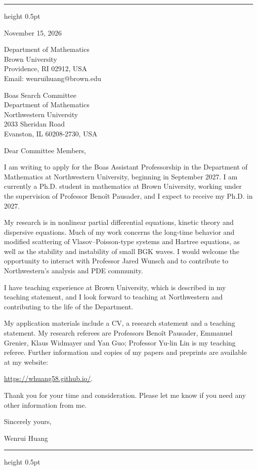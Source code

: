 \documentclass[10pt]{article}
\begin{document}
\vspace{0.08in}
\hrule height 0.5pt

\vspace{0.47in}
\hfill
\begin{minipage}{2.27in}
November 15, 2026

\vspace{0.16in}
Department of Mathematics\\
Brown University\\
Providence, RI 02912, USA\\
Email: wenrui\textunderscore huang@brown.edu
\end{minipage}

\vspace{0.30in}
Boas Search Committee\\
Department of Mathematics\\
Northwestern University\\
2033 Sheridan Road\\
Evanston, IL 60208-2730, USA

\vspace{0.16in}
Dear Committee Members,

I am writing to apply for the Boas Assistant Professorship in the Department of Mathematics at Northwestern University, beginning in September 2027. I am currently a Ph.D. student in mathematics at Brown University, working under the supervision of Professor Beno\^{i}t Pausader, and I expect to receive my Ph.D. in 2027.

My research is in nonlinear partial differential equations, kinetic theory and dispersive equations. Much of my work concerns the long-time behavior and modified scattering of Vlasov--Poisson-type systems and Hartree equations, as well as the stability and instability of small BGK waves. I would welcome the opportunity to interact with Professor Jared Wunsch and to contribute to Northwestern's analysis and PDE community.

I have teaching experience at Brown University, which is described in my teaching statement, and I look forward to teaching at Northwestern and contributing to the life of the Department.

My application materials include a CV, a research statement and a teaching statement. My research referees are Professors Beno\^{i}t Pausader, Emmanuel Grenier, Klaus Widmayer and Yan Guo; Professor Yu-lin Lin is my teaching referee. Further information and copies of my papers and preprints are available at my website:

\url{https://whuang58.github.io/}.

\medskip
Thank you for your time and consideration. Please let me know if you need any other information from me.

\vspace{0.12in}
Sincerely yours,

\vspace{0.12in}
Wenrui Huang

\vfill
\hrule height 0.5pt
\end{document}
